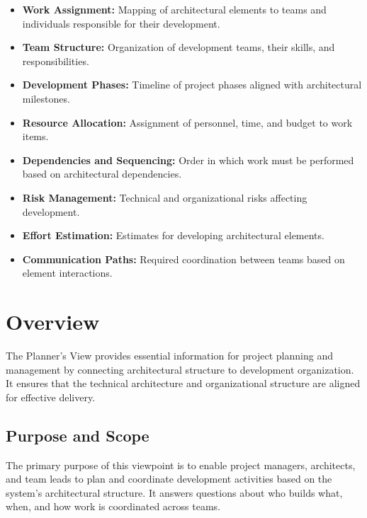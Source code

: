 \documentclass[11pt,letterpaper]{article}
\begin{document}
\begin{itemize}
    \item \textbf{Work Assignment:} Mapping of architectural elements to teams and individuals responsible for their development.
    
    \item \textbf{Team Structure:} Organization of development teams, their skills, and responsibilities.
    
    \item \textbf{Development Phases:} Timeline of project phases aligned with architectural milestones.
    
    \item \textbf{Resource Allocation:} Assignment of personnel, time, and budget to work items.
    
    \item \textbf{Dependencies and Sequencing:} Order in which work must be performed based on architectural dependencies.
    
    \item \textbf{Risk Management:} Technical and organizational risks affecting development.
    
    \item \textbf{Effort Estimation:} Estimates for developing architectural elements.
    
    \item \textbf{Communication Paths:} Required coordination between teams based on element interactions.
\end{itemize}

\section{Overview}

The Planner's View provides essential information for project planning and management by connecting architectural structure to development organization. It ensures that the technical architecture and organizational structure are aligned for effective delivery.

\subsection{Purpose and Scope}

The primary purpose of this viewpoint is to enable project managers, architects, and team leads to plan and coordinate development activities based on the system's architectural structure. It answers questions about who builds what, when, and how work is coordinated across teams.
\end{document}
